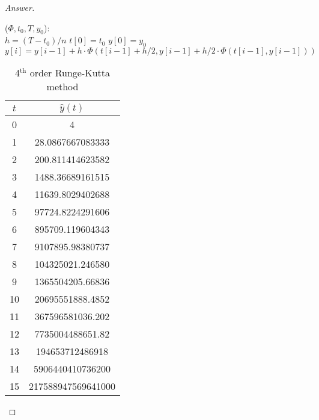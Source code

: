 \begin{proof}[Answer]
\begin{table}[H]
\ifnum{}
	\begin{algorithm2e}[H]
\else
	\begin{algorithm2e}[htbp]
\fi
	\KwFn(\(\Phi,t_0,T,y_0\)){:\\ }
	{
		\(h=(T-t_0)/n\)\;
		\(t[0]=t_0\)\;
		\(y[0]=y_0\)\;
		{
			\(y[i]=y[i-1]+h\cdot\Phi\left(t[i-1]+h/2,y[i-1]+h/2\cdot\Phi(t[i-1],y[i-1])\right)\)\;
		}
	}

	\caption{2\(^\text{nd}\) order Runge-Kutta method}
\end{algorithm2e}



\ifnum{}
	\begin{table}[H]
\else
	\begin{table}[htbp]
\fi
		\centering
		\begin{tabular}[t]{|c|c|}
		\hline
		\(t\)	&	\(\hat{y}(t)\)	\\	\hline
		0	&	4					\\	\hline
		1	&	28.0867667083333	\\	\hline
		2	&	200.811414623582	\\	\hline
		3	&	1488.36689161515	\\	\hline
		4	&	11639.8029402688	\\	\hline
		5	&	97724.8224291606	\\	\hline
		6	&	895709.119604343	\\	\hline
		7	&	9107895.98380737	\\	\hline
		8	&	104325021.246580	\\	\hline
		9	&	1365504205.66836	\\	\hline
		10	&	20695551888.4852	\\	\hline
		11	&	367596581036.202	\\	\hline
		12	&	7735004488651.82	\\	\hline
		13	&	194653712486918		\\	\hline
		14	&	5906440410736200	\\	\hline
		15	&	217588947569641000	\\	\hline
		\end{tabular}
		\caption{4\(^\text{th}\) order Runge-Kutta method}
		\label{rungekutta4}
	\end{table}
	

\end{table}
\end{algorithm2e}
\end{table}
\end{proof}
